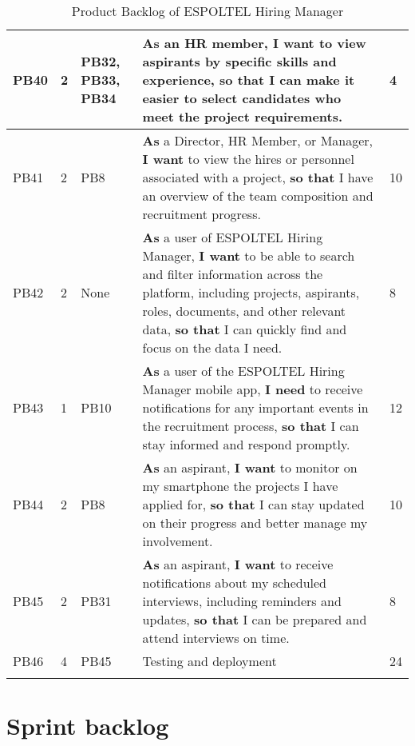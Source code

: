 \documentclass{scrreprt}
\begin{document}
\begin{longtable}{|p{0.8cm}|p{1.5cm}|p{2.5cm}|p{8cm}|p{2cm}|}
	PB40 & 2 & PB32, PB33, PB34  & \textbf{As} an HR member, \textbf{I want} to view aspirants by specific skills and experience, \textbf{so that} I can make it easier to select candidates who meet the project requirements. & 4 \\ \hline
	PB41 & 2 & PB8 & \textbf{As} a Director, HR Member, or Manager, \textbf{I want} to view the hires or personnel associated with a project, \textbf{so that} I have an overview of the team composition and recruitment progress. & 10 \\ \hline
	PB42 & 2 & None & \textbf{As} a user of ESPOLTEL Hiring Manager, \textbf{I want} to be able to search and filter information across the platform, including projects, aspirants, roles, documents, and other relevant data, \textbf{so that} I can quickly find and focus on the data I need. & 8 \\ \hline
	
	PB43 & 1 & PB10 & \textbf{As} a user of the ESPOLTEL Hiring Manager mobile app, \textbf{I need} to receive notifications for any important events in the recruitment process, \textbf{so that} I can stay informed and respond promptly. & 12 \\ \hline
	PB44 & 2 & PB8 & \textbf{As} an aspirant, \textbf{I want} to monitor on my smartphone the projects I have applied for, \textbf{so that} I can stay updated on their progress and better manage my involvement. & 10 \\ \hline
	PB45 & 2 & PB31 & \textbf{As} an aspirant, \textbf{I want} to receive notifications about my scheduled interviews, including reminders and updates, \textbf{so that} I can be prepared and attend interviews on time. & 8 \\ \hline
	
	PB46 & 4 & PB45 & Testing and deployment& 24\\ \hline
	\caption{Product Backlog of ESPOLTEL Hiring Manager}
\end{longtable}

\section{Sprint backlog}
\end{document}
